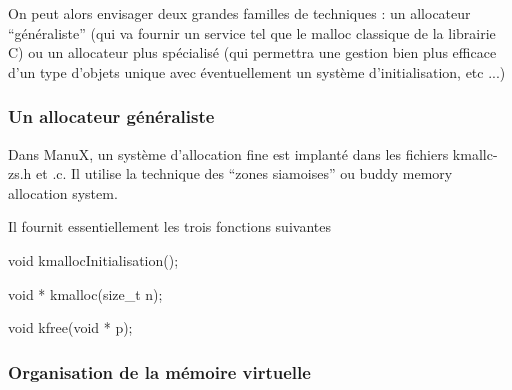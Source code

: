    On peut alors envisager deux grandes familles de techniques : un
allocateur ``généraliste''  (qui va fournir un service tel que le
malloc classique de la librairie C) ou un allocateur plus spécialisé
(qui permettra une gestion bien plus efficace d'un type d'objets
unique avec éventuellement un système d'initialisation, etc ...)

%  
\subsubsection{Un allocateur généraliste}

   Dans ManuX, un système d'allocation fine est implanté dans les
fichiers kmallc-zs.h et .c. Il utilise la technique des ``zones
siamoises'' ou buddy memory allocation system.

   Il fournit essentiellement les trois fonctions suivantes

void kmallocInitialisation();

void * kmalloc(size_t n);

void kfree(void * p);


\subsubsection{Organisation de la mémoire virtuelle}

